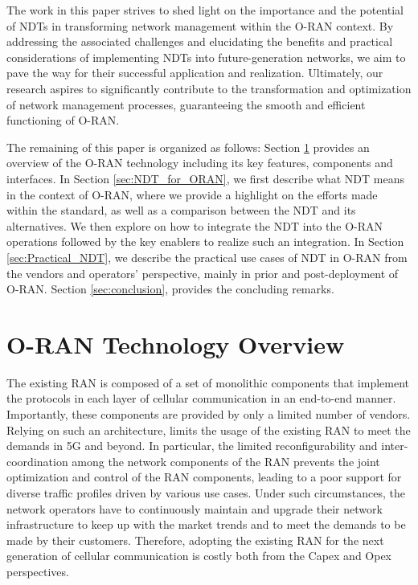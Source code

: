 \documentclass[]{IEEEtran}
\begin{document}
The work in this paper strives to shed light on the importance and the potential of NDTs in transforming network management within the O-RAN context. By addressing the associated challenges and elucidating the benefits and practical considerations of implementing NDTs into future-generation networks, we aim to pave the way for their successful application and realization. Ultimately, our research aspires to significantly contribute to the transformation and optimization of network management processes, guaranteeing the smooth and efficient functioning of O-RAN.

The remaining of this paper is organized as follows: Section \ref{sec:O-RANTechnologyReview} provides an overview of the O-RAN technology including its key features, components and interfaces. In Section \ref{sec:NDT_for_ORAN}, we first describe what NDT means in the context of O-RAN, where we provide a highlight on the efforts made within the standard, as well as a comparison between the NDT and its alternatives. We then explore on how to integrate the NDT into the O-RAN operations followed by the key enablers to realize such an integration. In Section \ref{sec:Practical_NDT}, we describe the practical use cases of NDT in O-RAN from the vendors and operators' perspective, mainly in prior and post-deployment of O-RAN. Section \ref{sec:conclusion}, provides the concluding remarks.


\section{O-RAN Technology Overview} \label{sec:O-RANTechnologyReview}

The existing RAN is composed of a set of monolithic components that implement the protocols in each layer of cellular communication in an end-to-end manner. Importantly, these components are provided by only a limited number of vendors. Relying on such an architecture, limits the usage of the existing RAN to meet the demands in 5G and beyond. In particular, the limited reconfigurability and inter-coordination among the network components of the RAN prevents the joint optimization and control of the RAN components, leading to a poor support for diverse traffic profiles driven by various use cases. Under such circumstances, the network operators have to continuously maintain and upgrade their network infrastructure to keep up with the market trends and to meet the demands to be made by their customers\cite{O-RAN_IEEE}. Therefore, adopting the existing RAN for the next generation of cellular communication is costly both from the Capex and Opex perspectives.
\end{document}
